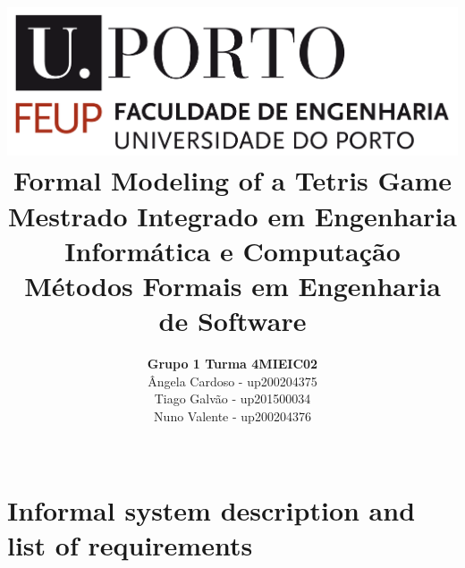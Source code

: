 \documentclass[a4paper]{article}
\begin{document}
\setlength{\textwidth}{16cm}
\setlength{\textheight}{22cm}


\title{\includegraphics[scale=0.15]{resources/img/feup_logo.png}
\linebreak\linebreak\linebreak\linebreak\linebreak
\Huge\textbf{Formal Modeling of a Tetris Game }\linebreak\linebreak
\linebreak\linebreak
\Large{Mestrado Integrado em Engenharia Informática e Computação} \linebreak\linebreak
\Large{Métodos Formais em Engenharia de Software}\linebreak\linebreak
}
\author{\textbf{Grupo 1 Turma 4MIEIC02}\\
Ângela Cardoso - up200204375\\
Tiago Galvão - up201500034\\
Nuno Valente - up200204376\\
\linebreak\linebreak \\
\linebreak\linebreak\linebreak
\linebreak\linebreak\vspace{1cm}}

\maketitle

\thispagestyle{empty}
\newpage
\tableofcontents
\newpage

\section{Informal system description and list of requirements}
\end{document}
